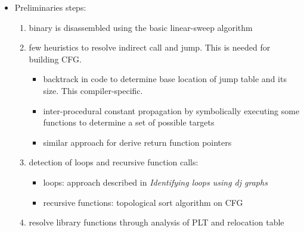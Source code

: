 \documentclass[10pt, a4paper]{article}
\begin{document}
\begin{itemize}
  \item Preliminaries steps:
    \begin{enumerate}
      \item binary is disassembled using the basic linear-sweep algorithm
      \item few heuristics to resolve indirect call and jump. This is needed for building CFG.
        \begin{itemize}
          \item backtrack in code to determine base location of jump table and its size. This compiler-specific.
          \item inter-procedural constant propagation by symbolically executing some functions to determine a set of possible targets
          \item similar approach for derive return function pointers
        \end{itemize}
      \item detection of loops and recursive function calls:
        \begin{itemize}
          \item loops: approach described in {\em Identifying loops using dj graphs}
          \item recursive functions: topological sort algorithm on CFG
        \end{itemize}
      \item resolve library functions through analysis of PLT and relocation table
    \end{enumerate}
\end{itemize}
\end{document}

